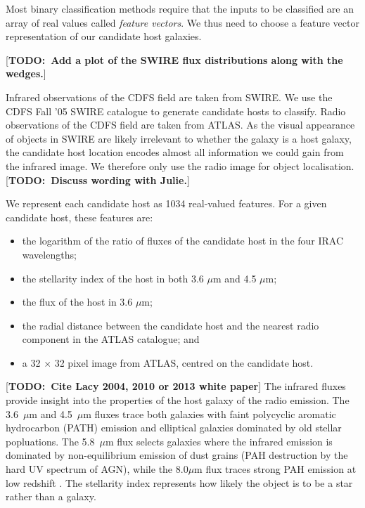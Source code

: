\documentclass[fleqn,usenatbib,usedcolumn]{mnras}
\newcommand{\todo}[1]{ {\color{red}[{\bf TODO:~{#1}}]} }
\begin{document}
    Most binary classification methods require that the inputs to be classified
    are an array of real values called \emph{feature vectors}. We thus need to
    choose a feature vector representation of our candidate host galaxies.

    \todo{Add a plot of the SWIRE flux distributions along with the wedges.}

    Infrared observations of the CDFS field are taken from SWIRE. We use the
    CDFS Fall '05 SWIRE catalogue \citep{surace05swire} to generate candidate
    hosts to classify. Radio observations of the CDFS field are taken from
    ATLAS. As the visual appearance of objects in SWIRE are likely irrelevant to
    whether the galaxy is a host galaxy, the candidate host location encodes
    almost all information we could gain from the infrared image. We therefore
    only use the radio image for object localisation. \todo{Discuss wording with
    Julie.}

    We represent each candidate host as 1034 real-valued features. For a given
    candidate host, these features are:
    \begin{itemize}
      \item the logarithm of the ratio of fluxes of the candidate host in the
        four IRAC wavelengths;
      \item the stellarity index of the host in both 3.6 $\mu$m and 4.5
        $\mu$m;
      \item the flux of the host in 3.6 $\mu$m;
      \item the radial distance between the candidate host and the nearest
        radio component in the ATLAS catalogue; and
      \item a 32 $\times$ 32 pixel image from ATLAS, centred on the candidate
        host.
    \end{itemize}

    \todo{Cite Lacy 2004, 2010 or 2013 white paper}
    The infrared fluxes provide insight into the properties of the host galaxy
    of the radio emission. The 3.6~$\mu$m and 4.5~$\mu$m fluxes trace both
    galaxies with faint polycyclic aromatic hydrocarbon (PATH) emission and
    elliptical galaxies dominated by old stellar popluations. The 5.8~$\mu$m
    flux selects galaxies where the infrared emission is dominated by
    non-equilibrium emission of dust grains (PAH destruction by the hard UV
    spectrum of AGN), while the 8.0$\mu$m flux traces strong PAH emission at
    low redshift \citep{citeneeded}. The stellarity index represents how
    likely the object is to be a star rather than a galaxy.
\end{document}
